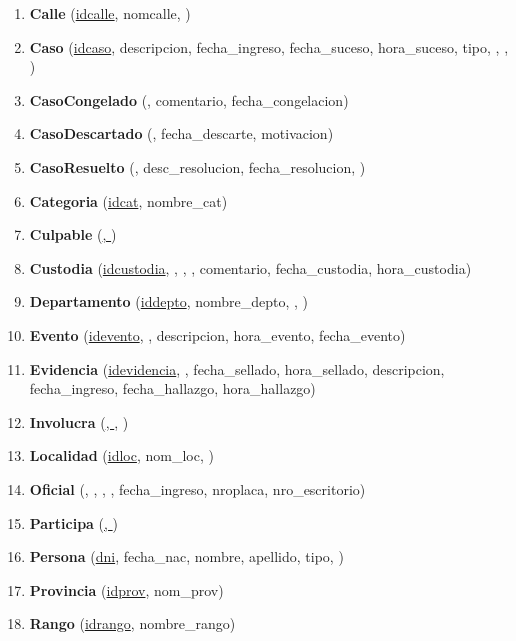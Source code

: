 \documentclass{article}
\theoremstyle{definition}
\theoremstyle{remark}
\begin{document}
\begin{enumerate}
\item \textbf{Calle} (\underline{idcalle}, nomcalle, )
\item \textbf{Caso} (\underline{idcaso}, descripcion, fecha\_ingreso, fecha\_suceso, hora\_suceso, tipo, , , )
\item \textbf{CasoCongelado} (, comentario, fecha\_congelacion)
\item \textbf{CasoDescartado} (, fecha\_descarte, motivacion)
\item \textbf{CasoResuelto} (, desc\_resolucion, fecha\_resolucion, )
\item \textbf{Categoria} (\underline{idcat}, nombre\_cat)
\item \textbf{Culpable} (\underline{, })
\item \textbf{Custodia} (\underline{idcustodia}, , , , comentario, fecha\_custodia, hora\_custodia)
\item \textbf{Departamento} (\underline{iddepto}, nombre\_depto, , )
\item \textbf{Evento} (\underline{idevento}, , descripcion, hora\_evento, fecha\_evento)
\item \textbf{Evidencia} (\underline{idevidencia}, , fecha\_sellado, hora\_sellado, descripcion, fecha\_ingreso, fecha\_hallazgo, hora\_hallazgo)
\item \textbf{Involucra} (\underline{, }, )
\item \textbf{Localidad} (\underline{idloc}, nom\_loc, )
\item \textbf{Oficial} (, , , , fecha\_ingreso, nroplaca, nro\_escritorio)
\item \textbf{Participa} (\underline{, })
\item \textbf{Persona} (\underline{dni}, fecha\_nac, nombre, apellido, tipo, )
\item \textbf{Provincia} (\underline{idprov}, nom\_prov)
\item \textbf{Rango} (\underline{idrango}, nombre\_rango)

\end{enumerate}
\end{document}

